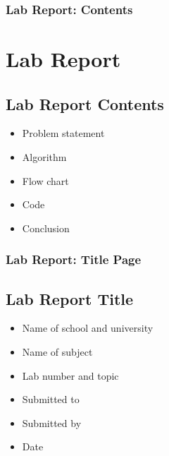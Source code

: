 \documentclass{beamer}
\begin{document}
\begin{frame}
    \frametitle{Lab Report: Contents}
    \section{Lab Report} %
    \label{sec:lab_report}
    \subsection{Lab Report Contents} %
    \label{sub:lab_report_contents}
    \begin{itemize}
        \item Problem statement
        \item Algorithm
        \item Flow chart
        \item Code
        \item Conclusion
    \end{itemize}
\end{frame}

\begin{frame}
    \frametitle{Lab Report: Title Page}
    \subsection{Lab Report Title} %
    \label{sub:lab_report_title}
    \begin{itemize}
        \item Name of school and university
        \item Name of subject
        \item Lab number and topic
        \item Submitted to
        \item Submitted by
        \item Date
    \end{itemize}
\end{frame}
\end{document}
